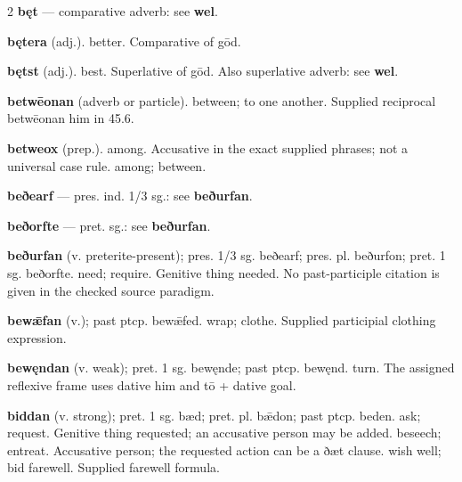 \begin{multicols*}{2}
\textbf{bęt} — comparative adverb: see \textbf{wel}.\par
\textbf{bętera} (adj.). better. Comparative of gōd.\par
\textbf{bętst} (adj.). best. Superlative of gōd. Also superlative adverb: see \textbf{wel}.\par
\textbf{betwēonan} (adverb or particle). between; to one another. Supplied reciprocal betwēonan him in 45.6.\par
\textbf{betweox} (prep.). among. Accusative in the exact supplied phrases; not a universal case rule. among; between.\par
\textbf{beðearf} — pres. ind. 1/3 sg.: see \textbf{beðurfan}.\par
\textbf{beðorfte} — pret. sg.: see \textbf{beðurfan}.\par
\textbf{beðurfan} (v. preterite-present); pres. 1/3 sg. beðearf; pres. pl. beðurfon; pret. 1 sg. beðorfte. need; require. Genitive thing needed. No past-participle citation is given in the checked source paradigm.\par
\textbf{bewǣfan} (v.); past ptcp. bewǣfed. wrap; clothe. Supplied participial clothing expression.\par
\textbf{bewęndan} (v. weak); pret. 1 sg. bewęnde; past ptcp. bewęnd. turn. The assigned reflexive frame uses dative him and tō + dative goal.\par
\textbf{biddan} (v. strong); pret. 1 sg. bæd; pret. pl. bǣdon; past ptcp. beden. ask; request. Genitive thing requested; an accusative person may be added. beseech; entreat. Accusative person; the requested action can be a ðæt clause. wish well; bid farewell. Supplied farewell formula.\par

\end{multicols*}
